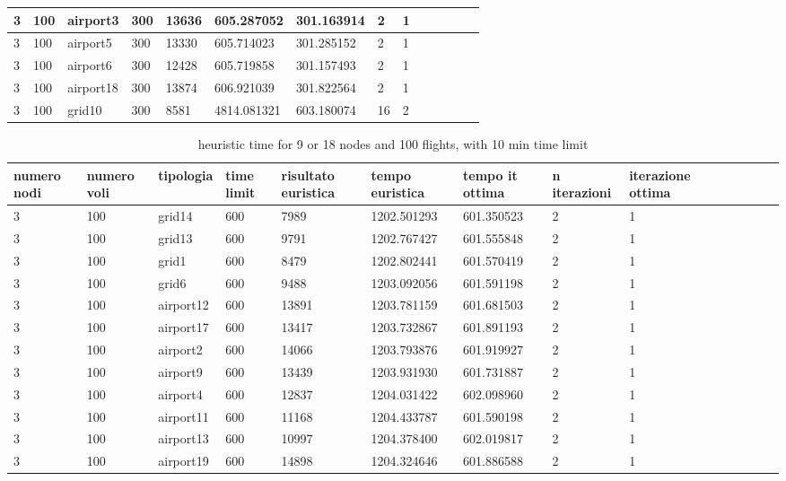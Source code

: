 \documentclass[../thesis.tex]{subfiles}
\begin{document}
\begin{table}[!ht]
\begin{tabularx}{\textwidth}{|X|X|X|X|X|X|X|X|X|X|X|X|X|X|}
        3 & 100 & airport3 & 300 & 13636 & 605.287052 & 301.163914 & 2 & 1 \\ \hline
        3 & 100 & airport5 & 300 & 13330 & 605.714023 & 301.285152 & 2 & 1 \\ \hline
        3 & 100 & airport6 & 300 & 12428 & 605.719858 & 301.157493 & 2 & 1 \\ \hline
        3 & 100 & airport18 & 300 & 13874 & 606.921039 & 301.822564 & 2 & 1 \\ \hline
        3 & 100 & grid10 & 300 & 8581 & 4814.081321 & 603.180074 & 16 & 2 \\ \hline
    \end{tabularx}
\end{table}
\begin{table}[!ht]
\caption{heuristic time for 9 or 18 nodes and 100 flights, with 10 min time limit}
    \centering
    \begin{tabularx}{\textwidth}{|X|X|X|X|X|X|X|X|X|X|X|X|X|X|}
    \hline
        numero nodi & numero voli & tipologia & time limit & risultato euristica & tempo euristica & tempo it ottima & n iterazioni &iterazione ottima  \\ \hline
        3 & 100 & grid14 & 600 & 7989 & 1202.501293 & 601.350523 & 2 & 1 \\ \hline
        3 & 100 & grid13 & 600 & 9791 & 1202.767427 & 601.555848 & 2 & 1 \\ \hline
        3 & 100 & grid1 & 600 & 8479 & 1202.802441 & 601.570419 & 2 & 1 \\ \hline
        3 & 100 & grid6 & 600 & 9488 & 1203.092056 & 601.591198 & 2 & 1 \\ \hline
        3 & 100 & airport12 & 600 & 13891 & 1203.781159 & 601.681503 & 2 & 1 \\ \hline
        3 & 100 & airport17 & 600 & 13417 & 1203.732867 & 601.891193 & 2 & 1 \\ \hline
        3 & 100 & airport2 & 600 & 14066 & 1203.793876 & 601.919927 & 2 & 1 \\ \hline
        3 & 100 & airport9 & 600 & 13439 & 1203.931930 & 601.731887 & 2 & 1 \\ \hline
        3 & 100 & airport4 & 600 & 12837 & 1204.031422 & 602.098960 & 2 & 1 \\ \hline
        3 & 100 & airport11 & 600 & 11168 & 1204.433787 & 601.590198 & 2 & 1 \\ \hline
        3 & 100 & airport13 & 600 & 10997 & 1204.378400 & 602.019817 & 2 & 1 \\ \hline
        3 & 100 & airport19 & 600 & 14898 & 1204.324646 & 601.886588 & 2 & 1 \\ \hline

\end{tabularx}
\end{table}
\end{document}
